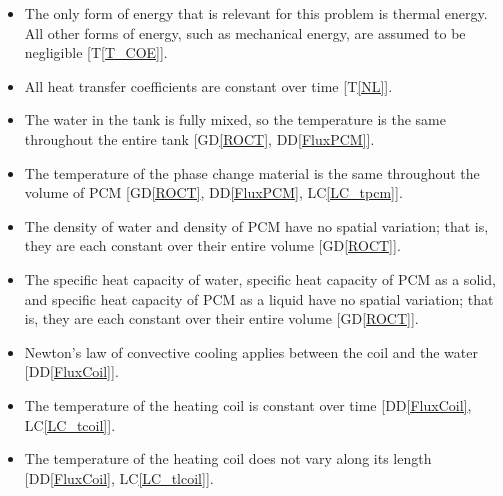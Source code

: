 \documentclass[12pt]{article}
\newcommand{\dref}[1]{GD\ref{#1}}
\newcommand{\ddref}[1]{DD\ref{#1}}
\newcommand{\tref}[1]{T\ref{#1}}
\newcounter{assumpnum} %
\newcommand{\lcref}[1]{LC\ref{#1}}
\begin{document}
\begin{itemize}

\item[A\refstepcounter{assumpnum}\theassumpnum \label{A_OnlyThermalEnergy}:] The
  only form of energy that is relevant for this problem is thermal energy.  All
  other forms of energy, such as mechanical energy, are assumed to be
  negligible [\tref{T_COE}].

\item[A\refstepcounter{assumpnum}\theassumpnum \label{A_hcoeff}:] All heat
  transfer coefficients are constant over time [\tref{NL}].

\item[A\refstepcounter{assumpnum}\theassumpnum \label{A_mixed}:] The water in
  the tank is fully mixed, so the temperature is the same throughout the entire
  tank [\dref{ROCT}, \ddref{FluxPCM}].

\item[A\refstepcounter{assumpnum}\theassumpnum \label{A_tpcm}:] The temperature
  of the phase change material is the same throughout the volume of PCM
  [\dref{ROCT}, \ddref{FluxPCM}, \lcref{LC_tpcm}].

\item[A\refstepcounter{assumpnum}\theassumpnum \label{A_const_density}:] The
  density of water and density of PCM have no spatial variation; that is, they
  are each constant over their entire volume [\dref{ROCT}].

\item[A\refstepcounter{assumpnum}\theassumpnum \label{A_const_C}:] The specific
  heat capacity of water, specific heat capacity of PCM as a solid, and specific
  heat capacity of PCM as a liquid have no spatial variation; that is, they are
  each constant over their entire volume  [\dref{ROCT}].

\item[A\refstepcounter{assumpnum}\theassumpnum \label{A_Newt_coil}:] Newton's
  law of convective cooling applies between the coil and the water [\ddref{FluxCoil}].
	
\item[A\refstepcounter{assumpnum}\theassumpnum \label{A_tcoil}:] The temperature
  of the heating coil is constant over time [\ddref{FluxCoil}, \lcref{LC_tcoil}].
	
\item[A\refstepcounter{assumpnum}\theassumpnum \label{A_tlcoil}:] The
  temperature of the heating coil does not vary along its
  length [\ddref{FluxCoil}, \lcref{LC_tlcoil}].


\end{itemize}
\end{document}
